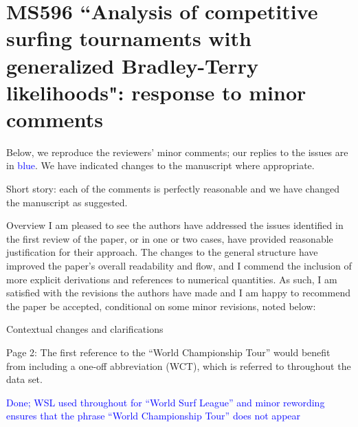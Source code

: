 \documentclass[12pt]{article}
\begin{document}
\section*{MS596 ``Analysis of competitive surfing tournaments with generalized Bradley-Terry likelihoods": response to minor comments}

Below, we reproduce the reviewers' minor comments; our replies to
the issues are in \textcolor{blue}{blue}.  We have indicated changes
to the manuscript where appropriate.

Short story: each of the  comments is perfectly reasonable and we have 
changed the manuscript as suggested.




Overview I am pleased to see the authors have addressed the issues
identified in the first review of the paper, or in one or two cases,
have provided reasonable justification for their approach. The changes
to the general structure have improved the paper’s overall readability
and flow, and I commend the inclusion of more explicit derivations and
references to numerical quantities. As such, I am satisfied with the
revisions the authors have made and I am happy to recommend the paper
be accepted, conditional on some minor revisions, noted below:



Contextual changes and clarifications

Page 2: The first reference to the ``World Championship Tour'' would
benefit from including a one-off abbreviation (WCT), which is referred
to throughout the data set.

\textcolor{blue}{Done; WSL used throughout for ``World Surf League''
  and minor rewording ensures that the phrase ``World Championship
  Tour'' does not appear}
\end{document}
